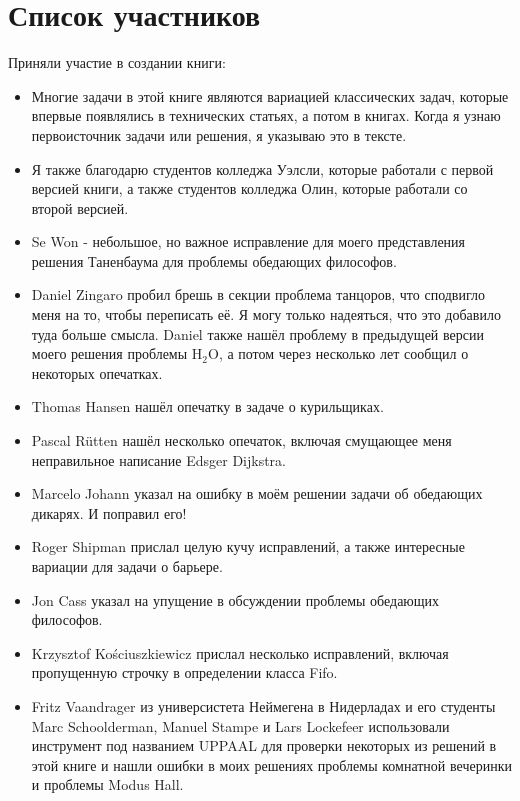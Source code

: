 \section*{Список участников}

Приняли участие в создании книги:

\begin{itemize}

\item Многие задачи в этой книге являются вариацией классических задач,
которые впервые появлялись в технических статьях, а потом в книгах.
Когда я узнаю первоисточник задачи или решения, я указываю это в тексте.

\item Я также благодарю студентов колледжа Уэлсли, которые работали с
первой версией книги, а также студентов колледжа Олин, которые работали
со второй версией.

\item Se Won - небольшое, но важное исправление для моего представления
решения Таненбаума для проблемы обедающих философов.

\item Daniel Zingaro пробил брешь в секции проблема танцоров, что
сподвигло меня на то, чтобы переписать её.
Я могу только надеяться, что это добавило туда больше смысла.
Daniel также нашёл проблему в предыдущей версии моего решения проблемы
H$_2$O, а потом через несколько лет сообщил о некоторых опечатках.

\item Thomas Hansen нашёл опечатку в задаче о курильщиках.

\item Pascal R\"{u}tten нашёл несколько опечаток, включая смущающее
меня неправильное написание Edsger Dijkstra.

\item Marcelo Johann указал на ошибку в моём решении задачи об обедающих
дикарях. И поправил его!

\item Roger Shipman прислал целую кучу исправлений, а также интересные
вариации для задачи о барьере.

\item Jon Cass указал на упущение в обсуждении проблемы обедающих философов.

\item Krzysztof Ko\'{s}ciuszkiewicz прислал несколько исправлений, включая
пропущенную строчку в определении класса Fifo.

\item Fritz Vaandrager из универсистета Неймегена в Нидерладах и его студенты
Marc Schoolderman, Manuel Stampe и Lars Lockefeer использовали инструмент под
названием UPPAAL для проверки некоторых из решений в этой книге и нашли
ошибки в моих решениях проблемы комнатной вечеринки и проблемы Modus Hall.


\end{itemize}
